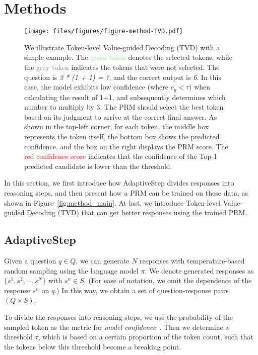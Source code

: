 
\section{Methods}

\begin{figure*}
    \centering
    \texttt{[image: files/figures/figure-method-TVD.pdf]}
    \caption{We illustrate Token-level Value-guided Decoding (TVD) with a simple example. The \textcolor{lightgreen}{green token} denotes the selected tokens, while the \textcolor{gray}{gray token} indicates the tokens that were not selected. The question is \textit{3 * (1 + 1) = ?}, and the correct output is \textit{6}. In this case, the model exhibits low confidence (where $c_y < \tau$) when calculating the result of
    1+1, and subsequently determines which number to multiply by 3. The PRM should select the best token based on its judgment to arrive at the correct final answer. As shown in the top-left corner, for each token, the middle box represents the token itself, the bottom box shows the predicted confidence, and the box on the right displays the PRM score. The \textcolor{red}{red confidence score} indicates that the confidence of the Top-1 predicted candidate is lower than the threshold.
    }
    \label{fig:figure-TVD}
\end{figure*}

In this section, we first introduce how AdaptiveStep divides responses into reasoning steps, and then present how a PRM can be trained on these data, as shown in Figure~\ref{fig:method_main}.
At last, we introduce Token-level Value-guided Decoding (TVD) that can get better responses using the trained PRM.

\vspace{0.5em}

\subsection{AdaptiveStep}

Given a question $q \in Q$, we can generate $N$ responses with temperature-based random sampling using the language model $\pi$.
We denote generated responses as $\{s^1, s^2, \cdots, s^N\}$ with $s^n \in S$.
(For ease of notation, we omit the dependence of the response $s^n$ on $q$.)
In this way, we obtain a set of question-response pairs $(Q\times S)$.


To divide the responses into reasoning steps, we use the probability of the sampled token as the metric for \textit{model confidence}~\cite{Hills2024usinglogprobs}. Then we determine a threshold $\tau$, which is based on a certain proportion of the token count, such that the tokens below this threshold become a breaking point.


